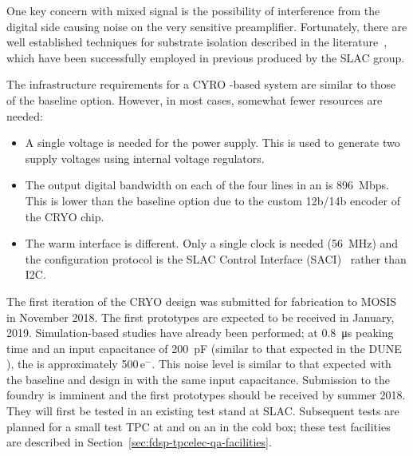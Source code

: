 One key concern with mixed signal  is the possibility of interference from the digital side causing noise on the very sensitive preamplifier. 
Fortunately, there are well established techniques for substrate isolation described in the literature~\cite{yeh}, which have been successfully employed in previous  produced by the SLAC group.%


The infrastructure requirements for a CYRO -based system are similar to those of the baseline option. However, in most cases, somewhat fewer resources are needed:
\begin{itemize}
\item{A single voltage is needed for the power supply. This is used to generate two supply voltages using internal voltage regulators.}
\item{The output digital bandwidth on each of the four lines in an  is \SI{896}{Mbps}. This is lower than the baseline option due to the custom 12b/14b encoder of the CRYO chip. }
\item{The warm interface is different. Only a single clock is needed (\SI{56}{MHz}) and the configuration protocol is the SLAC  Control Interface (SACI)~\cite{SACI} rather than I2C.}
\end{itemize}

The first iteration of the CRYO  design was submitted for fabrication to MOSIS in November 2018.  The first prototypes are expected to be received in January, 2019. Simulation-based studies have already been performed; at \SI{0.8}{\micro\second} peaking time and an input capacitance of \SI{200}{pF} (similar to that expected in the DUNE ), the  is approximately \num{500}\,e$^-$.  This noise level is similar to that expected with the baseline  and   design in \lar with the same input capacitance.  Submission to the  foundry is imminent and the first prototypes should be received by summer 2018. They will first be tested in an existing test stand at SLAC. Subsequent tests are planned for a small test TPC at \fnal and on an  in the  cold box; these test facilities are described in Section~\ref{sec:fdsp-tpcelec-qa-facilities}.

